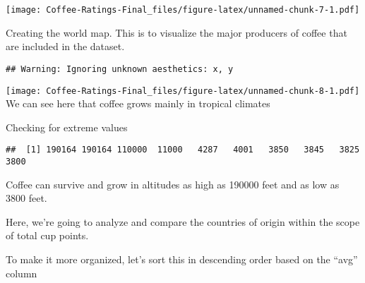\documentclass[
]{article}
\begin{document}
\texttt{[image: Coffee-Ratings-Final\_files/figure-latex/unnamed-chunk-7-1.pdf]}

Creating the world map. This is to visualize the major producers of
coffee that are included in the dataset.

\begin{verbatim}
## Warning: Ignoring unknown aesthetics: x, y
\end{verbatim}

\texttt{[image: Coffee-Ratings-Final\_files/figure-latex/unnamed-chunk-8-1.pdf]}
We can see here that coffee grows mainly in tropical climates

Checking for extreme values

\begin{verbatim}
##  [1] 190164 190164 110000  11000   4287   4001   3850   3845   3825   3800
\end{verbatim}

Coffee can survive and grow in altitudes as high as 190000 feet and as
low as 3800 feet.

Here, we're going to analyze and compare the countries of origin within
the scope of total cup points.

To make it more organized, let's sort this in descending order based on
the ``avg'' column
\end{document}
